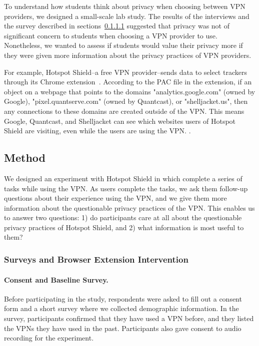 
To understand how students think about privacy when choosing between VPN
providers, we designed a small-scale lab study.  The results of the interviews
and the survey described in sections~\ref{} suggested that privacy was not of
significant concern to students when choosing a VPN provider to use.
Nonetheless, we wanted to assess if students would value their privacy more if
they were given more information about the privacy practices of VPN providers.

For example, Hotspot Shield--a free VPN
provider--sends data to select trackers through its Chrome
extension~\cite{windscribe-hotspot-shield}.  According to the PAC  file in the extension, if an object on a webpage that points to the
domains "analytics.google.com" (owned by Google), "pixel.quantserve.com"
(owned by Quantcast), or "shelljacket.us", then any connections to these
domains are created outside of the VPN.    This means Google, Quantcast, and Shelljacket can see which
websites users of Hotspot Shield are visiting, even while the users are using
the VPN. .

\subsection{Method} 

We designed an experiment with Hotspot Shield in which complete a series of tasks while using the VPN. As users complete the tasks, we ask them follow-up questions about their experience using the VPN, and we give them more information about the questionable privacy practices of the VPN. This enables us to answer two questions: 1) do participants care at all about the questionable privacy practices of Hotspot Shield, and 2) what information is most useful to them?

\subsubsection{Surveys and Browser Extension Intervention}

\paragraph{Consent and Baseline Survey.}
Before participating in the study, respondents were asked to fill out a
consent form and a short survey where we collected demographic information.
In the survey, participants confirmed that they have used a VPN before, and
they listed the VPNs they have used in the past.  Participants also gave
consent to audio recording for the experiment.

